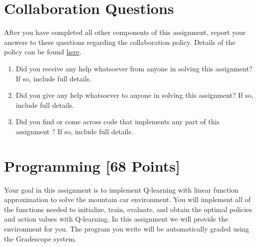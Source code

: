 \documentclass[11pt,addpoints,answers]{exam}
\begin{document}
\begin{questions}

    \clearpage
    \end{questions}
\newpage
\section{Collaboration Questions}
After you have completed all other components of this assignment, report your answers to these questions regarding the collaboration policy. Details of the policy can be found \href{http://www.cs.cmu.edu/~mgormley/courses/10601/syllabus.html}{here}.
\begin{enumerate}
    \item Did you receive any help whatsoever from anyone in solving this assignment? If so, include full details.
    \item Did you give any help whatsoever to anyone in solving this assignment? If so, include full details.
    \item Did you find or come across code that implements any part of this assignment ? If so, include full details.
\end{enumerate}

\begin{your_solution}[height=6cm]

\end{your_solution}
\newpage
\section{Programming [68 Points]}
\label{sec:code}

Your goal in this assignment is to implement Q-learning with linear function approximation to solve the mountain car environment. You will implement all of the functions needed to initialize, train, evaluate, and obtain the optimal policies and action values with Q-learning. In this assignment we will provide the environment for you. The program you write will be automatically graded using the Gradescope system.
\end{document}

